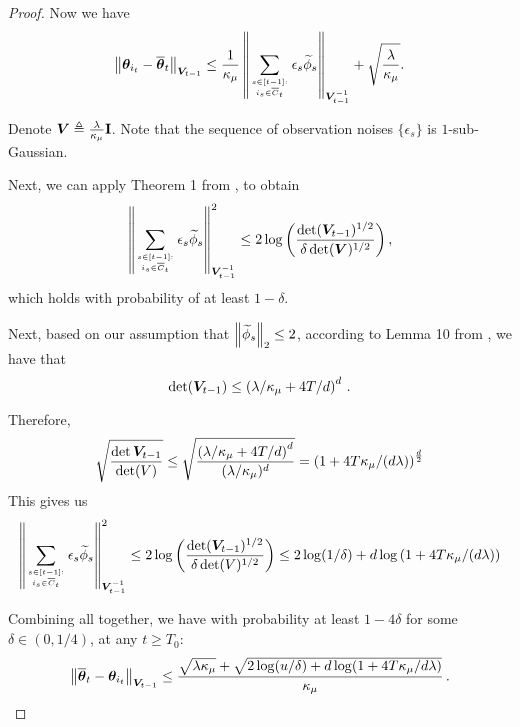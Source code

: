 \begin{proof}
Now we have
\begin{equation}
    \label{eqn:parUB}
    \left\| \boldsymbol{\theta}_{i_t} - \overline{\boldsymbol{\theta}}_t \right\|_{\boldsymbol{V}_{t-1}} \le \frac{1}{\kappa_\mu} \left\| \sum_{s\in[t-1]:\atop i_s\in\overline{C}_t}\epsilon_s \widetilde{\phi}_s \right\|_{\boldsymbol{V}_{t-1}^{-1}}  + \sqrt{\frac{\lambda}{\kappa_\mu}}.
\end{equation}

Denote $\boldsymbol{V} \triangleq \frac{\lambda}{\kappa_\mu} \mathbf{I}$.
Note that the sequence of observation noises $\{\epsilon_s\}$ is $1$-sub-Gaussian.

Next, we can apply Theorem 1 from \cite{abbasi2011improved}, to obtain
\begin{equation}
\left\| \sum_{s\in[t-1]:\atop i_s\in\overline{C}_t}\epsilon_s \widetilde{\phi}_s \right\|_{\boldsymbol{V}_{t-1}^{-1}}^2 \leq 2\log\left( \frac{\det(\boldsymbol{V}_{t-1})^{1/2}}{\delta\det(\boldsymbol{V})^{1/2}} \right),
\end{equation}
which holds with probability of at least $1-\delta$.

Next, based on our assumption that $\left\| \widetilde{\phi}_s \right\|_2 \leq 2$, according to Lemma 10 from \cite{abbasi2011improved}, we have that
\begin{equation}
\det(\boldsymbol{V}_{t-1}) \leq \left( \lambda/\kappa_\mu + 4T / d \right)^d\,.
\end{equation}

Therefore, 
\begin{equation}
\sqrt{\frac{\det{\boldsymbol{V}_{t-1}}}{\det(V)}} \leq \sqrt{\frac{\left( \lambda/\kappa_\mu + 4T / d \right)^d}{(\lambda/\kappa_\mu)^d}} = \left( 1 + 4T\kappa_{\mu}/(d\lambda) \right)^{\frac{d}{2}}
\label{eq:upper:bound:det:Vt:V}
\end{equation}
This gives us
\begin{equation}
\left\| \sum_{s\in[t-1]:\atop i_s\in\overline{C}_t}\epsilon_s \widetilde{\phi}_s \right\|_{\boldsymbol{V}_{t-1}^{-1}}^2 \leq 2\log\left( \frac{\det(\boldsymbol{V}_{t-1})^{1/2}}{\delta\det(V)^{1/2}} \right) \leq 2\log(1/\delta) + d\log\left( 1 + 4T\kappa_{\mu}/(d\lambda) \right)
\label{eq:upper:bound:proof:theta:interm}
\end{equation}

Combining all together, we have with probability at least $1-4\delta$ for some $\delta\in(0,1/4)$, at any $t\geq T_0$:
\begin{equation}
    \left\| \overline {\boldsymbol{\theta}}_t-\boldsymbol{\theta}_{i_t} \right\|_{\boldsymbol{V}_{t-1}}\leq\frac{\sqrt{\lambda \kappa_\mu}+\sqrt{2\log(u/\delta)+d\log(1+4T\kappa_\mu/d\lambda)}}{\kappa_\mu}\,.
\end{equation}\end{proof}
